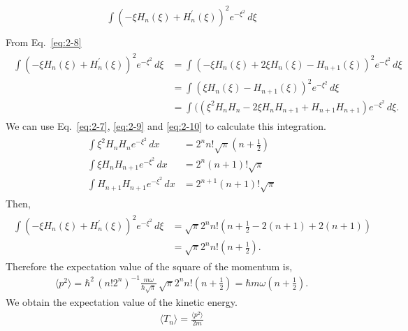 \documentclass[floatfix,nofootinbib,superscriptaddress,fleqn]{revtex4-2}
\begin{document}
\begin{itemize}
\begin{align}
\begin{split}
      \int(-\xi H_n\left(\xi\right) 
      +H^\prime_n\left(\xi\right))^2 e^{-\xi^2}\,d\xi  \\
    \end{split}
  \end{align}
  From Eq.~\eqref{eq:2-8}
  \begin{align}
    \begin{split}
      \int(-\xi H_n\left(\xi\right) 
      +H^\prime_n\left(\xi\right))^2 e^{-\xi^2}\,d\xi
      &=\int(-\xi H_n\left(\xi\right) 
      + 2\xi H_n(\xi)-H_{n+1}(\xi))^2 e^{-\xi^2}\,d\xi  \\
      &=\int(\xi H_n\left(\xi\right) 
      -H_{n+1}(\xi))^2 e^{-\xi^2}\,d\xi \\
      &=\int(
      (\xi^2H_nH_n-2\xi H_nH_{n+1}+H_{n+1}H_{n+1})  
      e^{-\xi^2}\,d\xi.
    \end{split}
  \end{align}
  We can use Eq.~\eqref{eq:2-7}, \eqref{eq:2-9} and \eqref{eq:2-10} to calculate 
  this integration.
  \begin{align}
    \begin{split}
      \int \xi^2 H_n H_n e^{-\xi^2}\,dx 
      &= 2^nn!\sqrt{\pi}\left( n+\frac{1}{2} \right) \\  
      \int \xi H_n H_{n+1} e^{-\xi^2}\,dx 
      &= 2^n(n+1)!\sqrt{\pi}\\  
      \int  H_{n+1} H_{n+1} e^{-\xi^2}\,dx 
      &= 2^{n+1}(n+1)!\sqrt{\pi}
    \end{split}
  \end{align}
  Then,
  \begin{align}
    \begin{split}
      \int(-\xi H_n\left(\xi\right) 
      +H^\prime_n\left(\xi\right))^2 e^{-\xi^2}\,d\xi
      &= \sqrt{\pi}2^nn!
      \left(n+\frac{1}{2}-2(n+1)+2(n+1) \right) \\
      &= \sqrt{\pi}2^nn!\left( n+\frac{1}{2} \right).
    \end{split}
  \end{align}
  Therefore the expectation value of the square of the momentum is,
  \begin{align}\label{eq:3-ps}
    \langle p^2\rangle = \hbar^2\,(n!2^n)^{-1}\frac{m\omega}{\hbar\sqrt{\pi}}\,
    \sqrt{\pi}2^nn!\left( n+\frac{1}{2} \right)
    =\hbar m\omega\left( n+\frac{1}{2} \right).
  \end{align}
  We obtain the expectation value of the kinetic energy.
  \begin{align}\label{eq:3-3}
    \langle T_n\rangle=\frac{\langle p^2\rangle}{2m}

\end{align}
\end{itemize}
\end{document}
